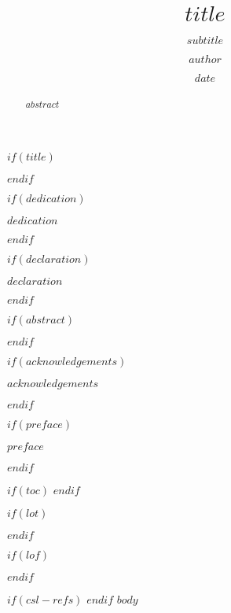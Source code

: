 \documentclass[12pt,twoside]{unicam}
\title{$title$}
\author{$author$}
\subtitle{$subtitle$}
\date{$date$}
\begin{document}
$if(title)$
  \maketitle
$endif$

\frontmatter %
\pagestyle{empty} %

$if(dedication)$
  \begin{dedication}
    $dedication$
  \end{dedication}
$endif$

$if(declaration)$
  \begin{declaration}
    $declaration$
  \end{declaration}
$endif$

$if(abstract)$
  \begin{abstract}
    $abstract$
  \end{abstract}
$endif$

$if(acknowledgements)$
  \begin{acknowledgements}
    $acknowledgements$
  \end{acknowledgements}
$endif$

$if(preface)$
  \begin{preface}
    $preface$
  \end{preface}
$endif$

$if(toc)$
  \hypersetup{linkcolor=$if(toccolor)$$toccolor$$else$black$endif$}
  \setcounter{tocdepth}{$toc-depth$}
  \tableofcontents
$endif$

$if(lot)$
  \listoftables
$endif$

$if(lof)$
  \listoffigures
$endif$

\printnomenclature

$if(csl-refs)$
\newlength{\cslhangindent}
\setlength{\cslhangindent}{1.5em}
\newenvironment{cslreferences}%
  {$if(csl-hanging-indent)$\setlength{\parindent}{0pt}%
  \everypar{\setlength{\hangindent}{\cslhangindent}}\ignorespaces$endif$}%
  {\par}
$endif$
\setlength{\parskip}{0.2cm}
\mainmatter %
\pagestyle{fancyplain} %
\hypersetup{
    colorlinks=true,
    linkcolor=black,
    filecolor=black,      
    urlcolor=black,
}
$body$
\end{document}
